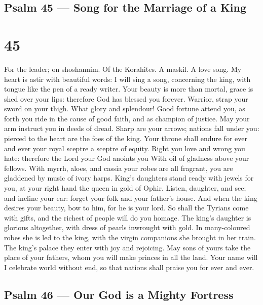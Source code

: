 \hypertarget{psalm-45-song-for-the-marriage-of-a-king}{%
\subsection{Psalm 45 --- Song for the Marriage of a
King}\label{psalm-45-song-for-the-marriage-of-a-king}}

\hypertarget{section-44}{%
\section{45}\label{section-44}}

For the leader; on shoshannim. Of the Korahites. A maskil. A love song.
 My heart is astir with beautiful words: I will sing a song,
concerning the king, with tongue like the pen of a ready writer.
 Your beauty is more than mortal, grace is shed over your
lips: therefore God has blessed you forever.  Warrior, strap
your sword on your thigh. What glory and splendour!  Good
fortune attend you, as forth you ride in the cause of good faith, and as
champion of justice. May your arm instruct you in deeds of dread.
 Sharp are your arrows; nations fall under you: pierced to
the heart are the foes of the king.  Your throne shall
endure for ever and ever your royal sceptre a sceptre of equity.
 Right you love and wrong you hate: therefore the Lord your
God anoints you With oil of gladness above your fellows. 
With myrrh, aloes, and cassia your robes are all fragrant, you are
gladdened by music of ivory harps.  King's daughters stand
ready with jewels for you, at your right hand the queen in gold of
Ophir.  Listen, daughter, and see; and incline your ear:
forget your folk and your father's house.  And when the
king desires your beauty, bow to him, for he is your lord. 
So shall the Tyrians come with gifts, and the richest of people will do
you homage.  The king's daughter is glorious altogether,
with dress of pearls inwrought with gold.  In many-coloured
robes she is led to the king, with the virgin companions she brought in
her train.  The king's palace they enter with joy and
rejoicing.  May sons of yours take the place of your
fathers, whom you will make princes in all the land.  Your
name will I celebrate world without end, so that nations shall praise
you for ever and ever.

\hypertarget{psalm-46-our-god-is-a-mighty-fortress}{%
\subsection{Psalm 46 --- Our God is a Mighty
Fortress}\label{psalm-46-our-god-is-a-mighty-fortress}}

